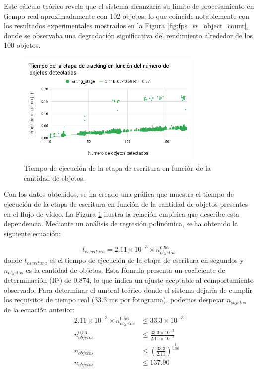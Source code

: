 \documentclass[11pt,spanish,listoffigures,listoftables]{tfgetsinf}
\begin{document}
Este cálculo teórico revela que el sistema alcanzaría su límite de procesamiento en tiempo real aproximadamente con 102 objetos, lo que coincide notablemente con los resultados experimentales mostrados en la Figura \ref{fig:fps_vs_object_count}, donde se observaba una degradación significativa del rendimiento alrededor de los 100 objetos.

\begin{figure}[H]
   \centering
   \includegraphics[width=0.8\textwidth]{images/analisis_de_la_solucion/cantidad_objetos/tiempo_etapa_escritura_cantidad_objetos.png}
   \caption{Tiempo de ejecución de la etapa de escritura en función de la cantidad de objetos.}
   \label{fig:tiempo_etapa_escritura_cantidad_objetos}
\end{figure}

Con los datos obtenidos, se ha creado una gráfica que muestra el tiempo de ejecución de la etapa de escritura en función de la cantidad de objetos presentes en el flujo de vídeo. La Figura \ref{fig:tiempo_etapa_escritura_cantidad_objetos} ilustra la relación empírica que describe esta dependencia. Mediante un análisis de regresión polinómica, se ha obtenido la siguiente ecuación:

\begin{equation}
   t_{escritura} = 2.11 \times 10^{-3} \times n_{objetos}^{0.56}
\end{equation}
donde $t_{escritura}$ es el tiempo de ejecución de la etapa de escritura en segundos y $n_{objetos}$ es la cantidad de objetos. Esta fórmula presenta un coeficiente de determinación (R²) de 0.874, lo que indica un ajuste aceptable al comportamiento observado.
Para determinar el umbral teórico donde el sistema dejaría de cumplir los requisitos de tiempo real (33.3 ms por fotograma), podemos despejar $n_{objetos}$ de la ecuación anterior:
\begin{align}
   2.11 \times 10^{-3} \times n_{objetos}^{0.56} &\leq 33.3 \times 10^{-3} \\
   n_{objetos}^{0.56} &\leq \frac{33.3 \times 10^{-3}}{2.11 \times 10^{-3}} \\
   n_{objetos} &\leq \left(\frac{33.3}{2.11}\right)^{\frac{1}{0.56}} \\
   n_{objetos} &\leq 137.90
\end{align}
\end{document}
